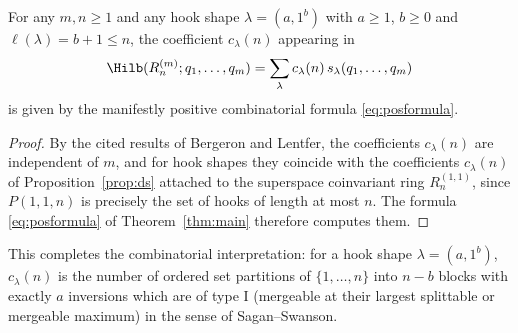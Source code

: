 \begin{corollary}\label{cor:general-m}
For any $m,n\ge1$ and any hook shape $\lambda=(a,1^b)$ with $a\ge1$, $b\ge0$ and
$\ell(\lambda)=b+1\le n$, the coefficient $c_\lambda(n)$ appearing in
\[
\Hilb(R_n^{(m)};q_1,\dots,q_m)=\sum_{\lambda}c_\lambda(n)\,s_\lambda(q_1,\dots,q_m)
\]
is given by the manifestly positive combinatorial formula \eqref{eq:posformula}.
\end{corollary}

\begin{proof}
By the cited results of Bergeron and Lentfer, the coefficients $c_\lambda(n)$ are
independent of $m$, and for hook shapes they coincide with the coefficients
$c_\lambda(n)$ of Proposition~\ref{prop:ds} attached to the superspace coinvariant ring
$R_n^{(1,1)}$, since $P(1,1,n)$ is precisely the set of hooks of length at most $n$. The
formula \eqref{eq:posformula} of Theorem~\ref{thm:main} therefore computes them.
\end{proof}

This completes the combinatorial interpretation: for a hook shape $\lambda=(a,1^b)$,
$c_\lambda(n)$ is the number of ordered set partitions of $\{1,\dots,n\}$ into $n-b$ blocks
with exactly $a$ inversions which are of type I (mergeable at their largest splittable or
mergeable maximum) in the sense of Sagan--Swanson.
